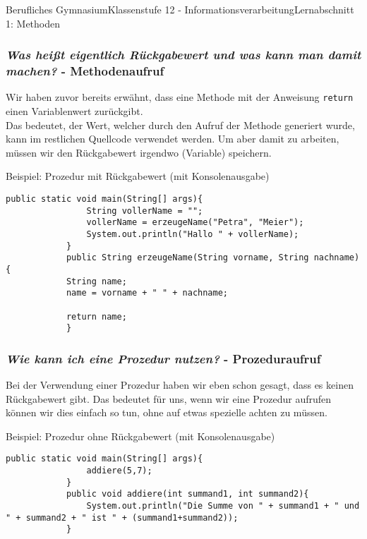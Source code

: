 \documentclass[11pt,oneside,openany,headings=optiontotoc,11pt,numbers=noenddot]{article}
\begin{document}
\begin{worksheet}{Berufliches Gymnasium}{Klassenstufe 12 - Informationsverarbeitung}{Lernabschnitt 1: Methoden}
		\subsubsection{\textit{Was heißt eigentlich Rückgabewert und was kann man damit machen?} - Methodenaufruf}
		Wir haben zuvor bereits erwähnt, dass eine Methode mit der Anweisung \lstinline[style=JavaInputStyle]|return| einen Variablenwert zurückgibt.\\
		Das bedeutet, der Wert, welcher durch den Aufruf der Methode generiert wurde, kann im restlichen Quellcode verwendet werden. Um aber damit zu arbeiten, müssen wir den Rückgabewert irgendwo (Variable) speichern.\\
		\begin{minipage}[t]{\textwidth}
			\vspace*{0pt}
			Beispiel: Prozedur mit Rückgabewert (mit Konsolenausgabe)
			\begin{lstlisting}[style=JavaInputStyle,frame=single]
			public static void main(String[] args){
				String vollerName = "";
				vollerName = erzeugeName("Petra", "Meier");
				System.out.println("Hallo " + vollerName);
			}
			public String erzeugeName(String vorname, String nachname){
			String name;
			name = vorname + " " + nachname;
			
			return name;
			}
			\end{lstlisting}
		\end{minipage}
		\subsubsection{\textit{Wie kann ich eine Prozedur nutzen?} - Prozeduraufruf}
		Bei der Verwendung einer Prozedur haben wir eben schon gesagt, dass es keinen Rückgabewert gibt. Das bedeutet für uns, wenn wir eine Prozedur aufrufen können wir dies einfach so tun, ohne auf etwas spezielle achten zu müssen.\\
		\begin{minipage}[t]{\textwidth}
			\vspace*{0pt}
			Beispiel: Prozedur ohne Rückgabewert (mit Konsolenausgabe)
			\begin{lstlisting}[style=JavaInputStyle,frame=single]
			public static void main(String[] args){
				addiere(5,7);
			}
			public void addiere(int summand1, int summand2){
				System.out.println("Die Summe von " + summand1 + " und " + summand2 + " ist " + (summand1+summand2));
			}
			\end{lstlisting}
		\end{minipage}
	\end{worksheet}
\end{document}

